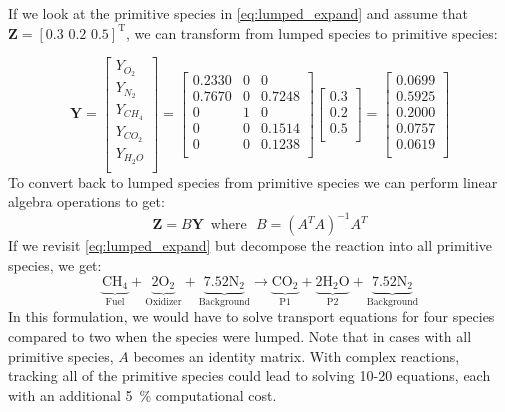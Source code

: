 If we look at the primitive species in \ref{eq:lumped_expand} and assume that $\mathbf{Z} = [0.3\, \, 0.2\, \, 0.5]^\mathrm{T}$, we can transform from lumped species to primitive species:

\begin{displaymath}
\mathbf{Y}=\left[\begin{array}{c}
       Y_{O_2} \\
       Y_{N_2} \\
       Y_{CH_4} \\
       Y_{CO_2} \\
       Y_{H_2O} \\
     \end{array}\right]
     =\left[\begin{array}{ccc}
     0.2330 & 0 & 0 \\
     0.7670 & 0 & 0.7248 \\
     0 & 1 & 0 \\
     0 & 0 & 0.1514 \\
     0 & 0 & 0.1238 \\
     \end{array}\right]
     \left[\begin{array}{c}
     0.3 \\
     0.2 \\
     0.5 \\
     \end{array}\right]
     =\left[\begin{array}{c}
     0.0699\\
     0.5925\\
     0.2000\\
     0.0757\\
     0.0619\\
     \end{array}\right]
\end{displaymath}
To convert back to lumped species from primitive species we can perform linear algebra operations to get:
\begin{equation}\label{eq:transform_back}
\textbf{Z}=B\textbf{Y} \, \, \, \text{where} \, \, \, \, B=(A^TA)^{-1}A^T
\end{equation}
If we revisit \ref{eq:lumped_expand} but decompose the reaction into all primitive species, we get:
\begin{equation}\label{eq:prim}
\underbrace{\mbox{CH}_4}_\text{Fuel}+\underbrace{2\mbox{O}_2}_\text{Oxidizer}+\underbrace{7.52\mbox{N}_2}_\text	{Background}\rightarrow \underbrace{\mbox{CO}_2}_\text{P1}+\underbrace{2\mbox{H}_2\mbox{O}}_\text{P2}+\underbrace{7.52\mbox{N}_2}_\text{Background}
\end{equation}
In this formulation, we would have to solve transport equations for four species compared to two when the species were lumped. Note that in cases with all primitive species, $A$ becomes an identity matrix. With complex reactions, tracking all of the primitive species could lead to solving 10-20 equations, each with an additional 5~\% computational cost.

